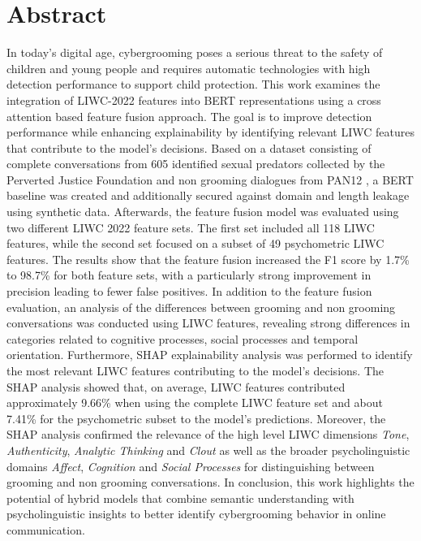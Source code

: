 \chapter{Abstract}

In today's digital age, cybergrooming poses a serious threat to the safety of children and young people and requires automatic technologies with high detection performance to support child protection. This work examines the integration of LIWC-2022 features \cite{pennebaker2022liwc} into BERT representations \cite{devlin2019bert} using a cross attention based feature fusion approach. The goal is to improve detection performance while enhancing explainability by identifying relevant LIWC features that contribute to the model's decisions. Based on a dataset consisting of complete conversations from 605 identified sexual predators collected by the Perverted Justice Foundation \cite{pj} and non grooming dialogues from PAN12 \cite{inches2012pan}, a BERT baseline was created and additionally secured against domain and length leakage using synthetic data. Afterwards, the feature fusion model was evaluated using two different LIWC 2022 feature sets. The first set included all 118 LIWC features, while the second set focused on a subset of 49 psychometric LIWC features. The results show that the feature fusion increased the F1 score by 1.7\% to 98.7\% for both feature sets, with a particularly strong improvement in precision leading to fewer false positives. In addition to the feature fusion evaluation, an analysis of the differences between grooming and non grooming conversations was conducted using LIWC features, revealing strong differences in categories related to cognitive processes, social processes and temporal orientation. Furthermore, SHAP \cite{lundberg2017shap} explainability analysis was performed to identify the most relevant LIWC features contributing to the model's decisions. The SHAP analysis showed that, on average, LIWC features contributed approximately 9.66\% when using the complete LIWC feature set and about 7.41\% for the psychometric subset to the model’s predictions. Moreover, the SHAP analysis confirmed the relevance of the high level LIWC dimensions \textit{Tone}, \textit{Authenticity}, \textit{Analytic Thinking} and \textit{Clout} as well as the broader psycholinguistic domains \textit{Affect}, \textit{Cognition} and \textit{Social Processes} for distinguishing between grooming and non grooming conversations. In conclusion, this work highlights the potential of hybrid models that combine semantic understanding with psycholinguistic insights to better identify cybergrooming behavior in online communication.